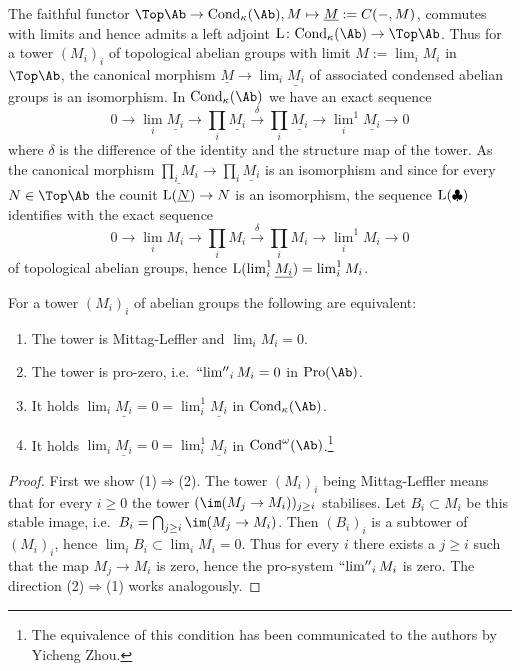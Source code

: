 \documentclass[colorinlistoftodos,article,11pt,reqno]{article}
\newcommand{\Pro}{\textup{Pro}}
\newcommand{\Cond}{\textup{Cond}}
\renewcommand{\to}[1][]{\overset{#1}{\rightarrow}}
\newcommand{\To}[1][]{\overset{#1}{\longrightarrow}}
\DeclareMathOperator*{\prolim}{``lim''}
\renewcommand{\L}{\textup{L}}
\begin{document}
\begin{appendix}
\begin{remark} \label{lim-and-lim^1-in-Ab-and-CondAb--remark}
The faithful functor $\Top\Ab \to \Cond_\kappa(\Ab), M\mapsto \underline{M} := C(-,M)$, commutes with limits and hence admits a left adjoint $\L \colon \Cond_\kappa(\Ab)\to\Top\Ab$. Thus for a tower $(M_i)_i$ of topological abelian groups with limit $M:=\lim_iM_i$ in $\Top\Ab$, the canonical morphism $\underline{M} \to \lim_i\underline{M_i}$ of associated condensed abelian groups is an isomorphism.
In $\Cond_\kappa(\Ab)$ we have an exact sequence
\[ \tag{$\clubsuit$}
0 \To \lim_i\underline{M_i} \To \prod_i\underline{M_i} \To[\delta] \prod_i\underline{M_i} \To {\lim_i}^1\underline{M_i} \To 0
\]
where $\delta$ is the difference of the identity and the structure map of the tower.
As the canonical morphism $\underline{\prod_iM_i}\To\prod_i\underline{M_i}$ is an isomorphism and since for every $N\in\Top\Ab$ the counit $\L(\underline{N})\to N$ is an isomorphism, the sequence $\L(\clubsuit)$ identifies with the exact sequence
\[
0 \To \lim_iM_i \To \prod_iM_i \To[\delta] \prod_iM_i \To {\lim_i}^1M_i \To 0
\]
of topological abelian groups, hence $\L(\lim_i^1\underline{M_i}) = \lim_i^1M_i$.
\end{remark}

\begin{lemma} \label{pro-vanishing-and-Mittag-Leffler--lemma}
For a tower $(M_i)_i$ of abelian groups the following are equivalent:
\begin{enumerate}
\item The tower is Mittag-Leffler and $\lim_iM_i=0$.
\item The tower is pro-zero, i.e.\ $\prolim_iM_i=0$ in $\Pro(\Ab)$.
\item It holds $\lim_i \underline{M_i} =0= \lim^1_i \underline{M_i}$ in $\Cond_\kappa(\Ab)$. 
\item It holds $\lim_i \underline{M_i} =0= \lim^1_i \underline{M_i}$ in $\Cond^\omega(\Ab)$.\footnote{The equivalence of this condition has been communicated to the authors by Yicheng Zhou.}
\end{enumerate}
\end{lemma}
\begin{proof}
First we show (1)$\Rightarrow$(2). The tower $(M_i)_i$ being Mittag-Leffler means that for every $i\geq 0$ the tower $(\im(M_j\to M_i))_{j\geq i}$ stabilises. Let $B_i\subset M_i$ be this stable image, i.e.\ $B_i=\bigcap_{j\geq i}\im(M_j\to M_i)$. 
Then $(B_i)_i$ is a subtower of $(M_i)_i$, hence $\lim_iB_i \subset \lim_iM_i =0$. Thus for every $i$ there exists a $j\geq i$ such that the map $M_j\to M_i$ is zero, hence the pro-system $\prolim_iM_i$ is zero. The direction (2)$\Rightarrow$(1) works analogously.


\end{proof}
\end{appendix}
\end{document}
